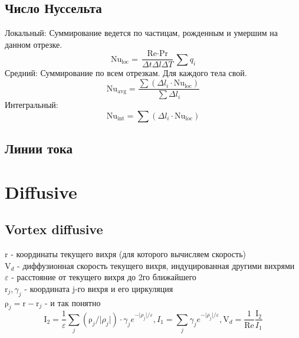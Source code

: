 \documentclass[14pt]{extreport}
\newcommand{\br}[1]{\boldsymbol{\mathrm{#1}}}
\newcommand{\Reyn}{\text{Re}}
\newcommand{\Pran}{\text{Pr}}
\newcommand{\Nuss}{\text{Nu}}
\begin{document}
\subsection{Число Нуссельта}

Локальный: Суммирование ведется по частицам, рожденным и умершим на данном отрезке.
$$\Nuss_\text{loc} = \dfrac{\Reyn \cdot \Pran}{\Delta t \Delta l \Delta T} \sum q_i$$
Средний: Суммирование по всем отрезкам. Для каждого тела свой.
$$\Nuss_\text{avg} = \dfrac{\sum (\Delta l_i \cdot \Nuss_\text{loc})}{\sum \Delta l_i}$$
Интегральный:
$$\Nuss_\text{int} = \sum ( \Delta l_i \cdot \Nuss_\text{loc})$$


\subsection{Линии тока}


\newpage
\section{Diffusive}
\subsection{Vortex diffusive}

$\br r$ - координаты текущего вихря (для которого вычисляем скорость) \\
$\br V_d$ - диффузионная скорость текущего вихря, индуцированная другими вихрями \\
$\varepsilon$ - расстояние от текущего вихря до 2го ближайшего \\
$\br r_j, \gamma_j$ - координата j-го вихря и его циркуляция \\
$\br\rho_j = \br r - \br r_j$ - и так понятно \\

\begin{equation*}
\br I_2 = \dfrac{1}{\varepsilon}
\sum\limits_j (\br\rho_j / \lvert\rho_j\rvert)\cdot\gamma_j e^{-\lvert\rho_j\rvert/\varepsilon},
I_1 = {\sum\limits_j \gamma_j e^{-\lvert\rho_j\rvert/\varepsilon}},
\br V_d = \dfrac{1}{\Reyn} \dfrac{\br I_2}{I_1}
\end{equation*}
\end{document}
